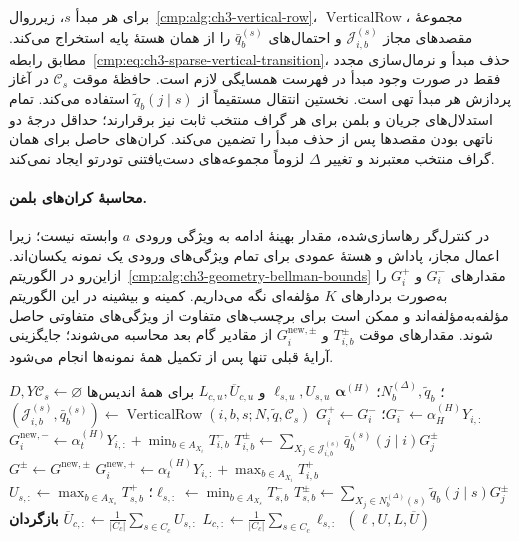 برای هر مبدأ $s$، زیرروال~\ref{cmp:alg:ch3-vertical-row}، $\operatorname{VerticalRow}$، مجموعهٔ مقصدهای مجاز $\mathcal J_{i,b}^{(s)}$ و احتمال‌های $\bar q_b^{(s)}$ را از همان هستهٔ پایه استخراج می‌کند. مطابق رابطه~\eqref{cmp:eq:ch3-sparse-vertical-transition}، حذف مبدأ و نرمال‌سازی مجدد فقط در صورت وجود مبدأ در فهرست همسایگی لازم است. حافظهٔ موقت $\mathcal C_s$ در آغاز پردازش هر مبدأ تهی است. نخستین انتقال مستقیماً از $\widetilde q_b(j\mid s)$ استفاده می‌کند. تمام استدلال‌های جریان و بلمن برای هر گراف منتخب ثابت نیز برقرارند؛ حداقل درجهٔ دو ناتهی بودن مقصدها پس از حذف مبدأ را تضمین می‌کند. کران‌های حاصل برای همان گراف منتخب معتبرند و تغییر $\Delta$ لزوماً مجموعه‌های دست‌یافتنی تودرتو ایجاد نمی‌کند.

\paragraph{محاسبهٔ کران‌های بلمن.}
در کنترل‌گر رهاسازی‌شده، مقدار بهینهٔ ادامه به ویژگی ورودی $a$ وابسته نیست؛ زیرا اعمال مجاز، پاداش و هستهٔ عمودی برای تمام ویژگی‌های ورودی یک نمونه یکسان‌اند. ازاین‌رو در الگوریتم~\ref{cmp:alg:ch3-geometry-bellman-bounds} مقدارهای $G_i^-$ و $G_i^+$ را به‌صورت بردارهای $K$ مؤلفه‌ای نگه می‌داریم. کمینه و بیشینه در این الگوریتم مؤلفه‌به‌مؤلفه‌اند و ممکن است برای برچسب‌های متفاوت از ویژگی‌های متفاوتی حاصل شوند. مقدارهای موقت $T_{i,b}^\pm$ و $G_i^{\mathrm{new},\pm}$ از مقادیر گام بعد محاسبه می‌شوند؛ جایگزینی آرایهٔ قبلی تنها پس از تکمیل همهٔ نمونه‌ها انجام می‌شود.

\begin{algorithm}[!htbp]
\caption{روند $\operatorname{BellmanBounds}$: کران‌های دوطرفهٔ بازنمایی‌ها و مراکز}
\label{cmp:alg:ch3-geometry-bellman-bounds}
\begin{algorithmic}[1]
\REQUIRE $D,Y$؛ $N_b^{(\Delta)},\widetilde q_b$؛ $\boldsymbol\alpha^{(H)}$
\ENSURE $\ell_{s,u},U_{s,u}$ و $L_{c,u},\overline U_{c,u}$ برای همهٔ اندیس‌ها
    \STATE $\mathcal C_s\gets\varnothing$
        \STATE $G_i^-\gets\alpha_H^{(H)}Y_{i,:}$؛ $G_i^+\gets G_i^-$
    \ENDFOR
            \STATE $(\mathcal J_{i,b}^{(s)},\bar q_b^{(s)})\gets\operatorname{VerticalRow}(i,b,s;N,\widetilde q,\mathcal C_s)$
            \STATE $T_{i,b}^{\pm}\gets\sum_{X_j\in\mathcal J_{i,b}^{(s)}}\bar q_b^{(s)}(j\mid i)G_j^{\pm}$
        \ENDFOR
            \STATE $G_i^{\mathrm{new},-}\gets\alpha_t^{(H)}Y_{i,:}+\min_{b\in A_{X_i}}T_{i,b}^-$
            \STATE $G_i^{\mathrm{new},+}\gets\alpha_t^{(H)}Y_{i,:}+\max_{b\in A_{X_i}}T_{i,b}^+$
        \ENDFOR
        \STATE $G^{\pm}\gets G^{\mathrm{new},\pm}$
    \ENDFOR
        \STATE $T_{s,b}^{\pm}\gets\sum_{X_j\in N_b^{(\Delta)}(s)}\widetilde q_b(j\mid s)G_j^{\pm}$
    \ENDFOR
    \STATE $\ell_{s,:}\gets\min_{b\in A_{X_s}}T_{s,b}^-$؛ $U_{s,:}\gets\max_{b\in A_{X_s}}T_{s,b}^+$
\ENDFOR
{}
    \STATE $L_{c,:}\gets\frac1{|C_c|}\sum_{s\in C_c}\ell_{s,:}$
    \STATE $\overline U_{c,:}\gets\frac1{|C_c|}\sum_{s\in C_c}U_{s,:}$
\ENDFOR
\STATE \textbf{بازگردان} $(\ell,U,L,\overline U)$
\end{algorithmic}
\end{algorithm}

